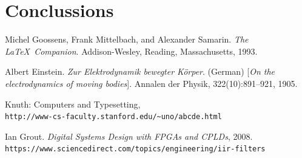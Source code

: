 \documentclass[12pt, a4paper]{article}
\begin{document}
\section{Conclussions}
\begin{thebibliography}{9}

Michel Goossens, Frank Mittelbach, and Alexander Samarin. 
\textit{The \LaTeX\ Companion}. 
Addison-Wesley, Reading, Massachusetts, 1993.

Albert Einstein. 
\textit{Zur Elektrodynamik bewegter K{\"o}rper}. (German) 
[\textit{On the electrodynamics of moving bodies}]. 
Annalen der Physik, 322(10):891–921, 1905.

Knuth: Computers and Typesetting,
\\\texttt{http://www-cs-faculty.stanford.edu/\~{}uno/abcde.html}



Ian Grout. 
\textit{Digital Systems Design with FPGAs and CPLDs}, 2008.
\\\texttt{https://www.sciencedirect.com/topics/engineering/iir-filters}

\end{thebibliography}
\end{document}
